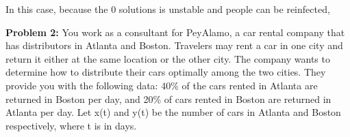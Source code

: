 \documentclass[12pt]{article}
\begin{document}
\begin{enumerate}
    In this case, because the 0 solutions is unstable and people can be reinfected, 
\end{enumerate}

\pagebreak 

\textbf{Problem 2:} You work as a consultant for PeyAlamo, a car rental company that has distributors in Atlanta and Boston. Travelers may rent a car in one city and return it either at the same location or the other city. The company wants to determine how to distribute their cars optimally among the two cities. They provide you with the following data: 40\% of the cars rented in Atlanta are returned in Boston per day, and 20\% of cars rented in Boston are returned in Atlanta per day. Let x(t) and y(t) be the number of cars in Atlanta and Boston respectively, where t is in days.
\end{document}
